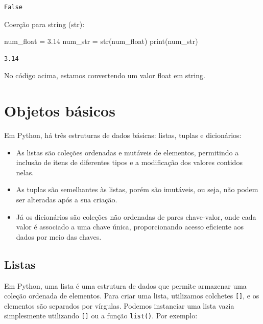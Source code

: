 \documentclass[
  portuguese,
  letterpaper,
  DIV=11,
  numbers=noendperiod]{scrreprt}
\newenvironment{Shaded}{\begin{snugshade}}{\end{snugshade}}
\newcommand{\BuiltInTok}[1]{\textcolor[rgb]{0.00,0.23,0.31}{#1}}
\newcommand{\FloatTok}[1]{\textcolor[rgb]{0.68,0.00,0.00}{#1}}
\newcommand{\NormalTok}[1]{\textcolor[rgb]{0.00,0.23,0.31}{#1}}
\newcommand{\OperatorTok}[1]{\textcolor[rgb]{0.37,0.37,0.37}{#1}}
\providecommand{\tightlist}{%
  \setlength{\itemsep}{0pt}\setlength{\parskip}{0pt}}
\theoremstyle{definition}
\theoremstyle{remark}
\begin{document}
\begin{verbatim}
False
\end{verbatim}

Coerção para string (str):

\begin{Shaded}
\begin{Highlighting}[]
\NormalTok{num\_float }\OperatorTok{=} \FloatTok{3.14}
\NormalTok{num\_str }\OperatorTok{=} \BuiltInTok{str}\NormalTok{(num\_float)}
\BuiltInTok{print}\NormalTok{(num\_str) }
\end{Highlighting}
\end{Shaded}

\begin{verbatim}
3.14
\end{verbatim}

No código acima, estamos convertendo um valor float em string.

\section{Objetos básicos}\label{objetos-buxe1sicos}

Em Python, há três estruturas de dados básicas: listas, tuplas e
dicionários:

\begin{itemize}
\tightlist
\item
  As listas são coleções ordenadas e mutáveis de elementos, permitindo a
  inclusão de itens de diferentes tipos e a modificação dos valores
  contidos nelas.
\item
  As tuplas são semelhantes às listas, porém são imutáveis, ou seja, não
  podem ser alteradas após a sua criação.
\item
  Já os dicionários são coleções não ordenadas de pares chave-valor,
  onde cada valor é associado a uma chave única, proporcionando acesso
  eficiente aos dados por meio das chaves.
\end{itemize}

\subsection{Listas}\label{listas-1}

Em Python, uma lista é uma estrutura de dados que permite armazenar uma
coleção ordenada de elementos. Para criar uma lista, utilizamos
colchetes \texttt{{[}{]}}, e os elementos são separados por vírgulas.
Podemos instanciar uma lista vazia simplesmente utilizando
\texttt{{[}{]}} ou a função \texttt{list()}. Por exemplo:
\end{document}
